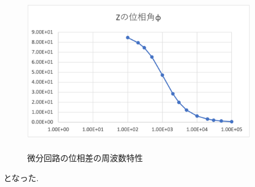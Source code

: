 \documentclass[a4j,10pt,dvipdfmx]{jarticle}
\begin{document}
\begin{figure}[H]
  \begin{center}
  \includegraphics[height=7cm,width=10cm]{bibun2.png}
  \caption{微分回路の位相差の周波数特性}
\end{center}
\end{figure}
となった.
\end{document}
